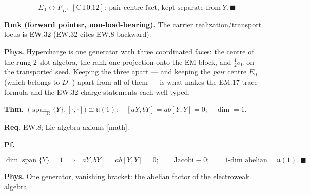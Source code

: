 \begin{theorem}
\[
\quad E_0\leftrightarrow F_{D^+}\ [\mathrm{CT0.12}]:\ \text{pair-centre fact, kept separate from}\ Y.\ \blacksquare
\]

\textbf{Rmk (forward pointer, non-load-bearing).} The carrier realization/transport locus is EW.32 (EW.32 cites EW.8 backward).

\textbf{Phys.} Hypercharge is one generator with three coordinated faces: the centre of the rung-2 slot algebra, the rank-one projection onto the EM block, and $\tfrac12\sigma_0$ on the transported seed. Keeping the three apart — and keeping the \textit{pair} centre $E_0$ (which belongs to $D^+$) apart from all of them — is what makes the EM.17 trace formula and the EW.32 charge statements each well-typed.

\end{theorem}

\begin{theorem}\label{tag:EW-9}
\textbf{Thm.} $\ \bigl(\operatorname{span}_{\mathbb R}\{Y\},[\cdot,\cdot]\bigr)\cong\mathfrak u(1):\quad[aY,bY]=ab[Y,Y]=0;\quad\dim=1.$

\textbf{Req.} EW.8; Lie-algebra axioms [math].

\textbf{Pf.}

\[
\dim\operatorname{span}\{Y\}=1\implies[aY,bY]=ab[Y,Y]=0;\qquad\text{Jacobi}\equiv0;\qquad
1\text{-dim abelian}=\mathfrak u(1).\ \blacksquare
\]

\textbf{Phys.} One generator, vanishing bracket: the abelian factor of the electroweak algebra.

\end{theorem}

